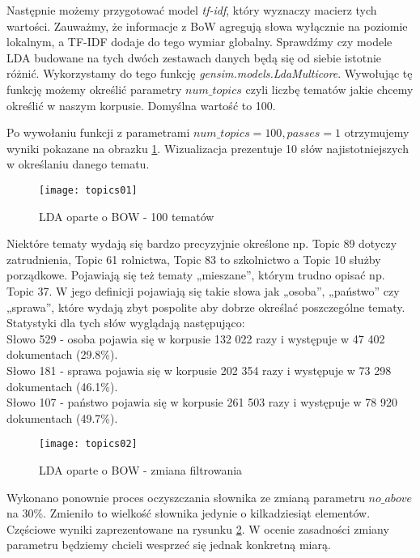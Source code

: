\documentclass[a4paper,11pt,twoside]{report}
\theoremstyle{definition}
\begin{document}
Następnie możemy przygotować model \textit{tf-idf}, który wyznaczy macierz tych wartości. Zauważmy, że informacje z BoW agregują słowa wyłącznie na poziomie lokalnym, a TF-IDF dodaje do tego wymiar globalny. Sprawdźmy czy modele LDA budowane na tych dwóch zestawach danych będą się od siebie istotnie różnić. Wykorzystamy do tego funkcję \textit{gensim.models.LdaMulticore}. Wywołując tę funkcję możemy określić parametry $num\_topics$ czyli liczbę tematów jakie chcemy określić w naszym korpusie. Domyślna wartość to 100.

Po wywołaniu funkcji z parametrami $ num\_topics=100, passes=1$ otrzymujemy wyniki pokazane na obrazku \ref{tm01}. Wizualizacja prezentuje 10 słów najistotniejszych w określaniu danego tematu. 

\begin{figure}
\texttt{[image: topics01]}
\centering  
\caption{LDA oparte o BOW - 100 tematów}
\label{tm01}
\end{figure}
Niektóre tematy wydają się bardzo precyzyjnie określone np. Topic 89 dotyczy zatrudnienia, Topic 61 rolnictwa, Topic 83 to szkolnictwo a Topic 10 służby porządkowe. Pojawiają się też tematy „mieszane”, którym trudno opisać np. Topic 37. W jego definicji pojawiają się takie słowa jak „osoba”, „państwo” czy „sprawa”, które wydają zbyt pospolite aby dobrze określać poszczególne tematy. Statystyki dla tych słów wyglądają następująco:\\
Słowo 529 - osoba pojawia się w korpusie 132 022 razy i występuje w 47 402 dokumentach (29.8\%).\\
Słowo 181 - sprawa pojawia się w korpusie 202 354 razy i występuje w 73 298 dokumentach (46.1\%).\\
Słowo 107 - państwo pojawia się w korpusie 261 503 razy i występuje w 78 920 dokumentach (49.7\%).

\begin{figure}
\texttt{[image: topics02]} 
\centering  
\caption{LDA oparte o BOW - zmiana filtrowania}
\label{tm02}
\end{figure}
Wykonano ponownie proces oczyszczania słownika ze zmianą parametru $no\_above$ na 30\%. Zmieniło to wielkość słownika jedynie o kilkadziesiąt elementów. Częściowe wyniki zaprezentowane na rysunku \ref{tm02}. W ocenie zasadności zmiany parametru będziemy chcieli wesprzeć się jednak konkretną miarą.
\end{document}
